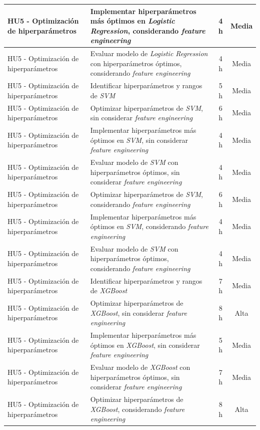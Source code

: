 \documentclass[
11pt, %
]{charter}
\begin{document}
\begin{xltabular}{\linewidth}{@{}|X|X|c|c|@{}}
HU5 - Optimización de hiperparámetros & Implementar hiperparámetros más óptimos en \textit{Logistic Regression}, considerando \textit{feature engineering} & 4 h & Media \\ \hline
HU5 - Optimización de hiperparámetros & Evaluar modelo de \textit{Logistic Regression} con hiperparámetros óptimos, considerando \textit{feature engineering} & 4 h & Media \\ \hline
HU5 - Optimización de hiperparámetros & Identificar hiperparámetros y rangos de \textit{SVM} & 5 h & Media \\ \hline
HU5 - Optimización de hiperparámetros & Optimizar hiperparámetros de \textit{SVM}, sin considerar \textit{feature engineering} & 6 h & Media \\ \hline
HU5 - Optimización de hiperparámetros & Implementar hiperparámetros más óptimos en \textit{SVM}, sin considerar \textit{feature engineering} & 4 h & Media \\ \hline
HU5 - Optimización de hiperparámetros & Evaluar modelo de \textit{SVM} con hiperparámetros óptimos, sin considerar \textit{feature engineering} & 4 h & Media \\ \hline
HU5 - Optimización de hiperparámetros & Optimizar hiperparámetros de \textit{SVM}, considerando \textit{feature engineering} & 6 h & Media \\ \hline
HU5 - Optimización de hiperparámetros & Implementar hiperparámetros más óptimos en \textit{SVM}, considerando \textit{feature engineering} & 4 h & Media \\ \hline
HU5 - Optimización de hiperparámetros & Evaluar modelo de \textit{SVM} con hiperparámetros óptimos, considerando \textit{feature engineering} & 4 h & Media \\ \hline
HU5 - Optimización de hiperparámetros & Identificar hiperparámetros y rangos de \textit{XGBoost} & 7 h & Media \\ \hline
HU5 - Optimización de hiperparámetros & Optimizar hiperparámetros de \textit{XGBoost}, sin considerar \textit{feature engineering} & 8 h & Alta \\ \hline
HU5 - Optimización de hiperparámetros & Implementar hiperparámetros más óptimos en \textit{XGBoost}, sin considerar \textit{feature engineering} & 5 h & Media \\ \hline
HU5 - Optimización de hiperparámetros & Evaluar modelo de \textit{XGBoost} con hiperparámetros óptimos, sin considerar \textit{feature engineering} & 7 h & Media \\ \hline
HU5 - Optimización de hiperparámetros & Optimizar hiperparámetros de \textit{XGBoost}, considerando \textit{feature engineering} & 8 h & Alta \\ \hline

\end{xltabular}
\end{document}
